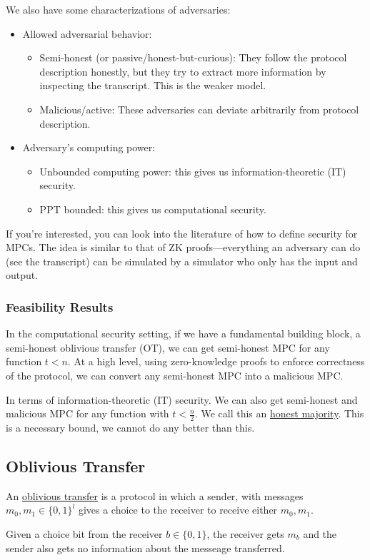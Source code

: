We also have some characterizations of adversaries:
\begin{itemize}
    \item Allowed adversarial behavior:
          \begin{itemize}
              \item Semi-honest (or passive/honest-but-curious): They follow the protocol description honestly, but they try to extract more information by inspecting the transcript. This is the weaker model.
              \item Malicious/active: These adversaries can deviate arbitrarily from protocol description.
          \end{itemize}
    \item Adversary's computing power:
          \begin{itemize}
              \item Unbounded computing power: this gives us information-theoretic (IT) security.
              \item PPT bounded: this gives us computational security.
          \end{itemize}
\end{itemize}

If you're interested, you can look into the literature of how to define security for MPCs. The idea is similar to that of ZK proofs---everything an adversary can do (see the transcript) can be simulated by a simulator who only has the input and output.


\subsubsection{Feasibility Results}
In the computational security setting, if we have a fundamental building block, a semi-honest oblivious transfer (OT), we can get semi-honest MPC for any function $t<n$. At a high level, using zero-knowledge proofs to enforce correctness of the protocol, we can convert any semi-honest MPC into a malicious MPC.

In terms of information-theoretic (IT) security. We can also get semi-honest and malicious MPC for any function with $t < \frac{n}{2}$. We call this an \ul{honest majority}. This is a necessary bound, we cannot do any better than this.

\subsection{Oblivious Transfer}
\begin{definition}
    An \ul{oblivious transfer} is a protocol in which a sender, with messages $m_0, m_1\in\{0, 1\}^l$ gives a choice to the receiver to receive either $m_0, m_1$.

    Given a choice bit from the receiver $b\in\{0,1\}$, the receiver gets $m_b$ and the sender also gets no information about the messeage transferred.

\end{definition}


